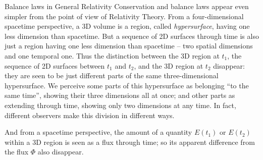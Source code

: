 \documentclass[a4paper,12pt,%
onecolumn,oneside,titlepage,%
british%
]{memoir}
\renewcommand*{\|}[1][]{\nonscript\:#1\vert\nonscript\:\mathopen{}}
\newcommand*{\yE}{E}
\newcommand*{\yH}{\varPhi}%
\begin{document}
\begin{extra}{Balance laws in General Relativity}
  Conservation and balance laws appear even simpler from the point of view of Relativity Theory. From a four-dimensional spacetime perspective, a 3D volume is a region, called \emph{hypersurface}, having one less dimension than spacetime. But a sequence of 2D surfaces through time is also just a region having one less dimension than spacetime -- two spatial dimensions and one temporal one. Thus the distinction between the 3D region at $t_{1}$, the sequence of 2D surfaces between $t_{1}$ and $t_{2}$, and the 3D region at $t_{2}$ disappear: they are seen to be just different parts of the same three-dimensional hypersurface. We perceive some parts of this hypersurface as belonging \enquote{to the same time}, showing their three dimensions all at once; and other parts as extending through time, showing only two dimensions at any time. In fact, different observers make this division in different ways.

  And from a spacetime perspective, the amount of a quantity $\yE(t_{1})$ or $\yE(t_{2})$ within a 3D region is seen as a flux through time; so its apparent difference from the flux $\yH$ also disappear. %
\end{extra}
%
\end{document}

